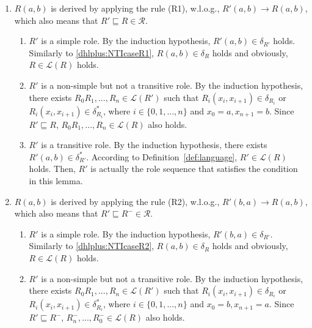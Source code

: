 \begin{enumerate}[leftmargin=12ex,label=Case~3.\arabic*, ref=Case~3.\arabic*]
\item $R(a,b)$ is derived by applying the rule (R1), w.l.o.g., $R'(a,b)\rightarrow R(a,b)$,
    which also means that $R'\sqsubseteq R\in\mathcal{R}$.\label{dhlplus:TIcaseR1}

    \begin{enumerate}[leftmargin=8ex,label=Case~3.1.\arabic*]
    \item $R'$ is a simple role. By the induction hypothesis, $R'(a,b)\in\delta_{R'}$ holds.
        Similarly to \ref{dhlplus:NTIcaseR1}, $R(a,b)\in\delta_{R}$ holds and
        obviously, $R\in\mathcal{L}(R)$ holds.

    \item $R'$ is a non-simple but not a transitive role.
        By the induction hypothesis, there exists $R_0R_1,...,R_n\in\mathcal{L}(R')$
        such that $R_i(x_i,x_{i+1})\in\delta_{R_i}$ or $R_i(x_i,x_{i+1})\in\delta^*_{R_i}$, where $i\in\{0,1,...,n\}$
        and $x_0=a, x_{n+1}=b$. Since $R'\sqsubseteq R$, $R_0R_1,...,R_n\in\mathcal{L}(R)$ also holds.

    \item $R'$ is a transitive role.
        By the induction hypothesis, there exists $R'(a,b)\in\delta^*_{R'}$.
        According to Definition~\ref{def:language}, $R'\in\mathcal{L}(R)$ holds.
        Then, $R'$ is actually the role sequence that satisfies the condition
        in this lemma.
    \end{enumerate}

\item $R(a,b)$ is derived by applying the rule (R2), w.l.o.g., $R'(b,a)\rightarrow R(a,b)$,
    which also means that $R'\sqsubseteq R^-\in\mathcal{R}$.

    \begin{enumerate}[leftmargin=8ex,label=Case~3.2.\arabic*]
    \item $R'$ is a simple role. By the induction hypothesis, $R'(b,a)\in\delta_{R'}$.
        Similarly to \ref{dhlplus:NTIcaseR2}, $R(a,b)\in\delta_{R}$ holds and
        obviously, $R\in\mathcal{L}(R)$ holds.

    \item $R'$ is a non-simple but not a transitive role. By the induction hypothesis, there exists $R_0R_1,...,R_n\in\mathcal{L}(R')$
        such that $R_i(x_i,x_{i+1})\in\delta_{R_i}$ or $R_i(x_i,x_{i+1})\in\delta^*_{R_i}$, where $i\in\{0,1,...,n\}$
        and $x_0=b, x_{n+1}=a$. Since $R'\sqsubseteq R^-$, $R_n^-,...,R_0^-\in\mathcal{L}(R)$ also holds.


\end{enumerate}
\end{enumerate}
